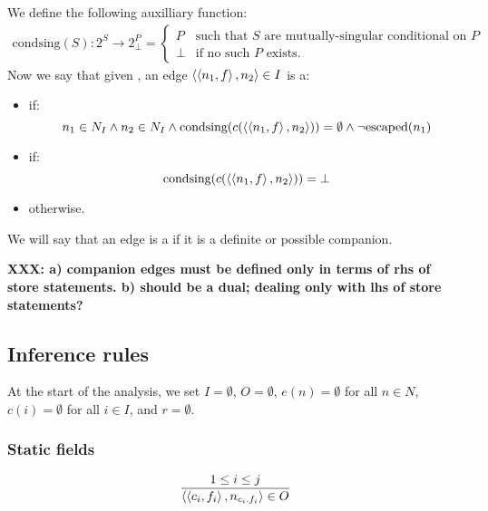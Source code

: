 \documentclass[11pt,notitlepage]{article}
\begin{document}
We define the following auxilliary function:
\begin{multline*}
\text{condsing}(S):2^S\to 2^P_\bot = \begin{cases}
P & \text{such that } S \text{ are mutually-singular conditional on }P \\
\bot & \text{if no such }P\text{ exists.}
\end{cases}
\end{multline*}
Now we say that given ,
an edge $\left\langle \left\langle n_1,f \right\rangle,n_2 \right\rangle \in I$ is a:
\begin{itemize}
\item {} if:
\begin{displaymath}
 n_1\in N_I \wedge n_2\in N_I \wedge
 \text{condsing}(c(\left\langle \left\langle n_1,f \right\rangle,n_2 \right\rangle))=\emptyset \wedge
 \neg\text{escaped}(n_1)
\end{displaymath}
\item {} if:
\begin{displaymath}
 \text{condsing}(c(\left\langle \left\langle n_1,f \right\rangle,n_2 \right\rangle)) = \bot
\end{displaymath}
\item {} otherwise.
\end{itemize}
We will say that an edge is a  if it is a
definite or possible companion.

\textbf{XXX: a) companion edges must be defined only in terms of rhs
  of store statements. b) should be a dual; dealing only with lhs of
  store statements?}

\subsection{Inference rules}
At the start of the analysis, we set $I=\emptyset$, $O=\emptyset$,
$e(n)=\emptyset$ for all $n\in N$, $c(i)=\emptyset$ for all $i\in I$,
and $r=\emptyset$.

\subsubsection{Static fields}

\begin{displaymath}
\dfrac{1\leq i \leq j}{\left\langle \left\langle c_i,f_i \right\rangle,n_{c_i.f_i} \right\rangle\in O}
\end{displaymath}
\end{document}
